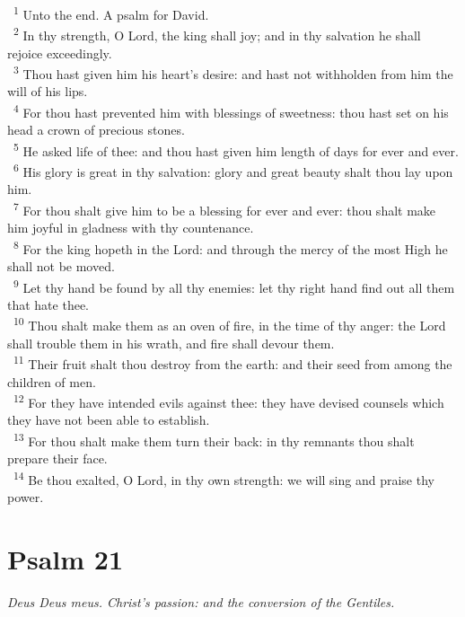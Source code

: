 \documentclass[a5paper,12pt]{article}
\begin{document}
\begin{multicols*}{2}
~\textsuperscript{1} Unto the end. A psalm for David.\\
~\textsuperscript{2} In thy strength, O Lord, the king shall joy; and in thy salvation he shall rejoice exceedingly.\\
~\textsuperscript{3} Thou hast given him his heart's desire: and hast not withholden from him the will of his lips.\\
~\textsuperscript{4} For thou hast prevented him with blessings of sweetness: thou hast set on his head a crown of precious stones.\\
~\textsuperscript{5} He asked life of thee: and thou hast given him length of days for ever and ever.\\
~\textsuperscript{6} His glory is great in thy salvation: glory and great beauty shalt thou lay upon him.\\
~\textsuperscript{7} For thou shalt give him to be a blessing for ever and ever: thou shalt make him joyful in gladness with thy countenance.\\
~\textsuperscript{8} For the king hopeth in the Lord: and through the mercy of the most High he shall not be moved.\\
~\textsuperscript{9} Let thy hand be found by all thy enemies: let thy right hand find out all them that hate thee.\\
~\textsuperscript{10} Thou shalt make them as an oven of fire, in the time of thy anger: the Lord shall trouble them in his wrath, and fire shall devour them.\\
~\textsuperscript{11} Their fruit shalt thou destroy from the earth: and their seed from among the children of men.\\
~\textsuperscript{12} For they have intended evils against thee: they have devised counsels which they have not been able to establish.\\
~\textsuperscript{13} For thou shalt make them turn their back: in thy remnants thou shalt prepare their face.\\
~\textsuperscript{14} Be thou exalted, O Lord, in thy own strength: we will sing and praise thy power.\\

\section{Psalm 21}
\label{sec:org6b73972}
\emph{Deus Deus meus. Christ's passion: and the conversion of the Gentiles.}\\


\end{multicols*}
\end{document}
